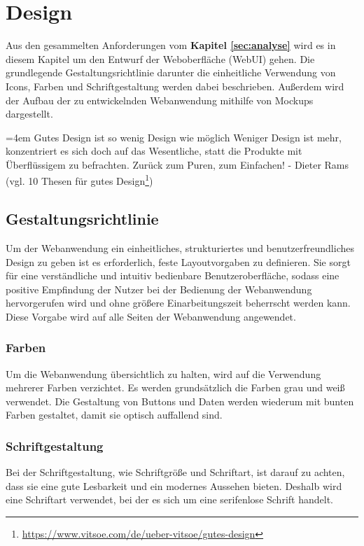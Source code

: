 \chapter{Design}
\label{sec:design}
Aus den gesammelten Anforderungen vom \textbf{Kapitel \ref{sec:analyse}} wird es in diesem Kapitel um den Entwurf der Weboberfläche (WebUI) gehen. Die grundlegende Gestaltungsrichtlinie darunter die einheitliche Verwendung von Icons, Farben und Schriftgestaltung werden dabei beschrieben. Außerdem wird der Aufbau der zu entwickelnden Webanwendung mithilfe von Mockups dargestellt.\bigskip

\par
\begingroup
\leftskip=4em %
\rightskip\leftskip
\noindent \glqq Gutes Design ist so wenig Design wie möglich
Weniger Design ist mehr, konzentriert es sich doch auf das Wesentliche, statt die Produkte mit Überflüssigem zu befrachten. Zurück zum Puren, zum Einfachen!\grqq{} - Dieter Rams (vgl. 10 Thesen für gutes Design\footnote{\url{https://www.vitsoe.com/de/ueber-vitsoe/gutes-design}})
\par
\endgroup
\bigskip

\section{Gestaltungsrichtlinie}
\label{sec:gestaltungsrichtlinie}
Um der Webanwendung ein einheitliches, strukturiertes und benutzerfreundliches Design zu geben ist es erforderlich, feste Layoutvorgaben zu definieren. Sie sorgt für eine verständliche und intuitiv bedienbare Benutzeroberfläche, sodass eine positive Empfindung der Nutzer bei der Bedienung der Webanwendung hervorgerufen wird und ohne größere Einarbeitungszeit beherrscht werden kann. Diese Vorgabe wird auf alle Seiten der Webanwendung angewendet.

\subsection{Farben}
\label{subsec:farben}
Um die Webanwendung übersichtlich zu halten, wird auf die Verwendung mehrerer Farben verzichtet. Es werden grundsätzlich die Farben grau und weiß verwendet. Die Gestaltung von Buttons und Daten werden wiederum mit bunten Farben gestaltet, damit sie optisch auffallend sind.

\subsection{Schriftgestaltung}
\label{subsec:schriftgestaltung}
Bei der Schriftgestaltung, wie Schriftgröße und Schriftart, ist darauf zu achten, dass sie eine gute Lesbarkeit und ein modernes Aussehen bieten. Deshalb wird eine Schriftart verwendet, bei der es sich um eine serifenlose Schrift handelt.


